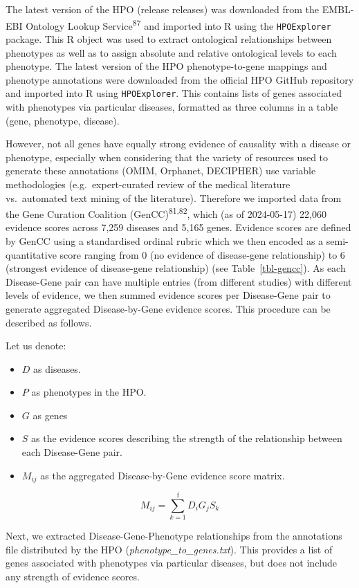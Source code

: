 \documentclass[
]{article}
\begin{document}
The latest version of the HPO (release releases) was downloaded from the
EMBL-EBI Ontology Lookup Service\textsuperscript{87} and imported into R
using the \texttt{HPOExplorer} package. This R object was used to
extract ontological relationships between phenotypes as well as to
assign absolute and relative ontological levels to each phenotype. The
latest version of the HPO phenotype-to-gene mappings and phenotype
annotations were downloaded from the official HPO GitHub repository and
imported into R using \texttt{HPOExplorer}. This contains lists of genes
associated with phenotypes via particular diseases, formatted as three
columns in a table (gene, phenotype, disease).

However, not all genes have equally strong evidence of causality with a
disease or phenotype, especially when considering that the variety of
resources used to generate these annotations (OMIM, Orphanet, DECIPHER)
use variable methodologies (e.g.~expert-curated review of the medical
literature vs.~automated text mining of the literature). Therefore we
imported data from the Gene Curation Coalition
(GenCC)\textsuperscript{81,82}, which (as of 2024-05-17) 22,060 evidence
scores across 7,259 diseases and 5,165 genes. Evidence scores are
defined by GenCC using a standardised ordinal rubric which we then
encoded as a semi-quantitative score ranging from 0 (no evidence of
disease-gene relationship) to 6 (strongest evidence of disease-gene
relationship) (see Table~\ref{tbl-gencc}). As each Disease-Gene pair can
have multiple entries (from different studies) with different levels of
evidence, we then summed evidence scores per Disease-Gene pair to
generate aggregated Disease-by-Gene evidence scores. This procedure can
be described as follows.

Let us denote:

\begin{itemize}
\item
  \(D\) as diseases.
\item
  \(P\) as phenotypes in the HPO.
\item
  \(G\) as genes
\item
  \(S\) as the evidence scores describing the strength of the
  relationship between each Disease-Gene pair.
\item
  \(M_{ij}\) as the aggregated Disease-by-Gene evidence score matrix.
\end{itemize}

\[
M_{ij} = \sum_{k=1}^{\text{f}} D_i G_j S_k
\]

Next, we extracted Disease-Gene-Phenotype relationships from the
annotations file distributed by the HPO
(\emph{phenotype\_to\_genes.txt}). This provides a list of genes
associated with phenotypes via particular diseases, but does not include
any strength of evidence scores.
\end{document}
